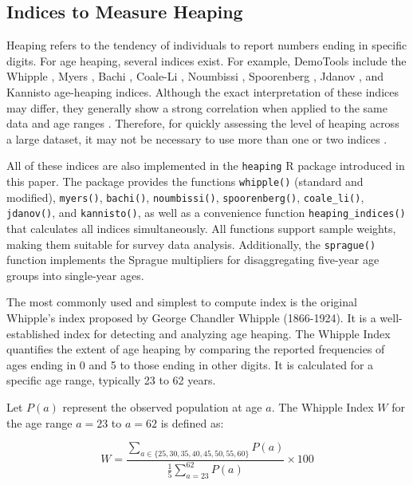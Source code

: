 \documentclass[12pt]{article}
\theoremstyle{plain}
\theoremstyle{definition}
\begin{document}
\subsection{Indices to Measure Heaping}

Heaping refers to the tendency of individuals to report numbers ending in specific digits.
For age heaping, several indices exist.
For example, DemoTools \citep{aburto2022} include the Whipple \citep{spoorenberg2007}, Myers \citep{myers1954}, Bachi \citep{bachi1951}, Coale-Li \citep{coale1991}, Noumbissi \citep{noumbissi1992}, Spoorenberg \citep{spoorenberg2007}, Jdanov \citep{jdanov2008}, and Kannisto \citep{kannisto1999} age-heaping indices. Although the exact interpretation of these indices may differ, they generally show a strong correlation when applied to the same data and age ranges \citep{aburto2022}. Therefore, for quickly assessing the level of heaping across a large dataset, it may not be necessary to use more than one or two indices \citep{aburto2022}.

All of these indices are also implemented in the \texttt{heaping} R package introduced in this paper. The package provides the functions \texttt{whipple()} (standard and modified), \texttt{myers()}, \texttt{bachi()}, \texttt{noumbissi()}, \texttt{spoorenberg()}, \texttt{coale\_li()}, \texttt{jdanov()}, and \texttt{kannisto()}, as well as a convenience function \texttt{heaping\_indices()} that calculates all indices simultaneously. All functions support sample weights, making them suitable for survey data analysis. Additionally, the \texttt{sprague()} function implements the Sprague multipliers \citep{sprague1880} for disaggregating five-year age groups into single-year ages.

The most commonly used \citep{rasul23} and simplest to compute index is the original Whipple's index
proposed by George Chandler Whipple (1866-1924). It is a well-established index for detecting and analyzing age heaping.
The Whipple Index quantifies the extent of age heaping by comparing the reported frequencies of ages ending in 0 and 5 to those ending in other digits. It is calculated for a specific age range, typically 23 to 62 years.

Let \( P(a) \) represent the observed population at age \( a \). The Whipple Index \( W \) for the age range \( a = 23 \) to \( a = 62 \) is defined as:

\[
W = \frac{\sum_{a \in \{25,30,35,40,45,50,55,60\}} P(a)}{\frac{1}{5} \sum_{a=23}^{62} P(a)} \times 100
\]
\end{document}
